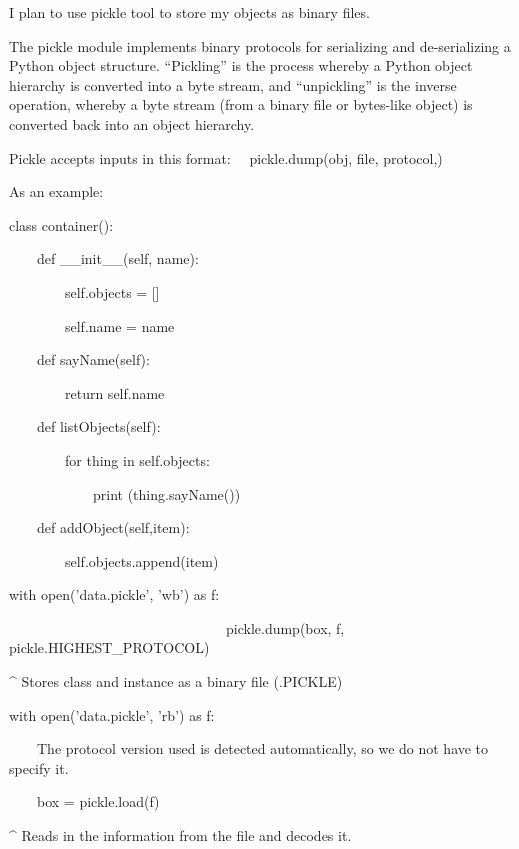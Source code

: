 \documentclass[a4paper,12pt]{report}
\begin{document}
\bigskip

I plan to use pickle tool to store my objects as binary files.

The pickle module implements binary protocols for serializing and de-serializing a Python object structure. ``Pickling'' is the process whereby a Python object hierarchy is converted into a byte stream, and ``unpickling'' is the inverse operation, whereby a byte stream (from a binary file or bytes-like object) is converted back into an object hierarchy.

Pickle accepts inputs in this format: \ \ pickle.dump(obj, file, protocol,)

As an example: \ 
\bigskip

class container():

\ \ \ \ def \_\_init\_\_(self, name):

\ \ \ \ \ \ \ \ self.objects = []

\ \ \ \ \ \ \ \ self.name = name


\bigskip

\ \ \ \ def sayName(self):

\ \ \ \ \ \ \ \ return self.name


\bigskip

\ \ \ \ def listObjects(self):

\ \ \ \ \ \ \ \ for thing in self.objects:

\ \ \ \ \ \ \ \ \ \ \ \ print (thing.sayName())


\bigskip

\ \ \ \ def addObject(self,item):

\ \ \ \ \ \ \ \ self.objects.append(item)


\bigskip


with open('data.pickle', 'wb') as f:

\ \ \ \ \ \ \ \ \ \ \ \ \ \ \ \ \ \ \ \ \ \ \ \ \ \ \ \ \ \ \ pickle.dump(box, f, pickle.HIGHEST\_PROTOCOL)


\bigskip

\^{} Stores class and instance as a binary file (.PICKLE)


\bigskip


\bigskip

with open('data.pickle', 'rb') as f:

\ \ \ \ The protocol version used is detected automatically, so we do not have to specify it.

\ \ \ \ box = pickle.load(f)


\bigskip

\^{} Reads in the information from the file and decodes it.
\end{document}
